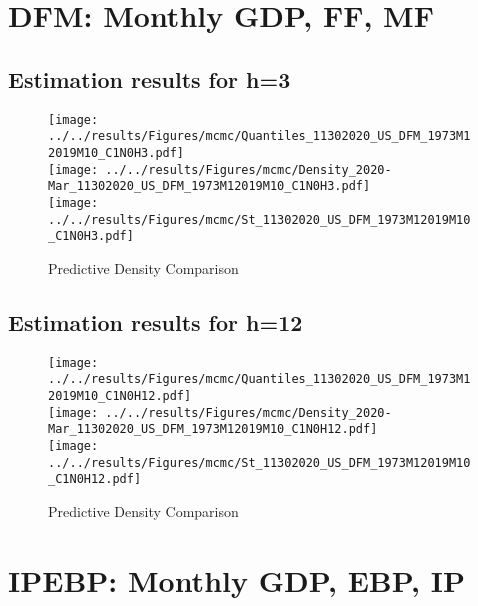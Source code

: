 \documentclass[12pt]{article}
\numberwithin{table}{subsection}
\numberwithin{figure}{section}
\begin{document}
\clearpage

\section{DFM: Monthly GDP, FF, MF}
\subsection{Estimation results for h=3}

\begin{figure}[htb!]
	\caption{Predictive Density Comparison}
	\centering
	\texttt{[image: ../../results/Figures/mcmc/Quantiles\_11302020\_US\_DFM\_1973M12019M10\_C1N0H3.pdf]}\\
	\texttt{[image: ../../results/Figures/mcmc/Density\_2020-Mar\_11302020\_US\_DFM\_1973M12019M10\_C1N0H3.pdf]}\\
	\texttt{[image: ../../results/Figures/mcmc/St\_11302020\_US\_DFM\_1973M12019M10\_C1N0H3.pdf]}
\end{figure}

\clearpage

\subsection{Estimation results for h=12}

\begin{figure}[htb!]
	\caption{Predictive Density Comparison}
	\centering
	\texttt{[image: ../../results/Figures/mcmc/Quantiles\_11302020\_US\_DFM\_1973M12019M10\_C1N0H12.pdf]}\\
	\texttt{[image: ../../results/Figures/mcmc/Density\_2020-Mar\_11302020\_US\_DFM\_1973M12019M10\_C1N0H12.pdf]}\\
	\texttt{[image: ../../results/Figures/mcmc/St\_11302020\_US\_DFM\_1973M12019M10\_C1N0H12.pdf]}\\
\end{figure}


\clearpage
\section{IPEBP: Monthly GDP, EBP, IP}
\end{document}

